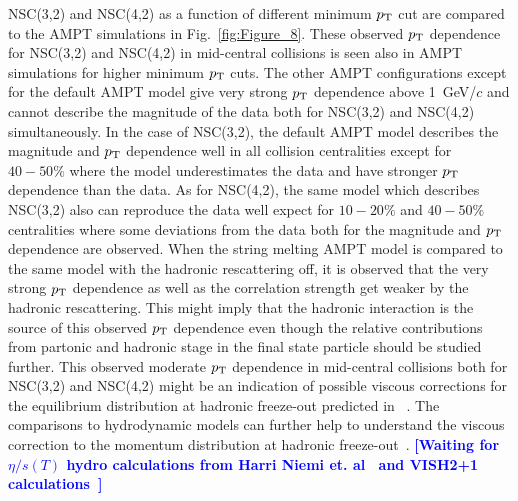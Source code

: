 NSC(3,2) and NSC(4,2) as a function of different minimum $p_{\rm T}$ cut are compared to the {AMPT} simulations in Fig.~\ref{fig:Figure_8}.
These observed $p_{\rm T}$ dependence for NSC(3,2) and NSC(4,2) in mid-central collisions is seen also in AMPT simulations for higher minimum $p_{\rm T}$ cuts.
The other AMPT configurations except for the default AMPT model give very strong $p_{\rm T}$ dependence above 1~GeV/$c$ and cannot describe the magnitude of the data both for NSC(3,2) and NSC(4,2) simultaneously.
In the case of NSC(3,2), the default AMPT model describes the magnitude and $p_{\rm T}$ dependence well in all collision centralities except for $40-50\%$ where the model underestimates the data and have stronger $p_{\rm T}$ dependence than the data.
As for  NSC(4,2), the same model which describes NSC(3,2) also can reproduce the data well expect for $10-20\%$ and $40-50\%$ centralities where some deviations from the data both for the magnitude and $p_{\rm T}$ dependence are observed.
When the string melting AMPT model is compared to the same model with the hadronic rescattering off, it is observed that the very strong $p_{\rm T}$ dependence as well as the correlation strength get weaker by the hadronic rescattering.
This might imply that the hadronic interaction is the source of this observed $p_{\rm T}$ dependence even though the relative contributions from partonic and hadronic stage in the final state particle should be studied further.
This observed moderate $p_{\rm T}$ dependence in mid-central collisions both for NSC(3,2) and NSC(4,2) might be an indication of possible viscous corrections for the equilibrium distribution at hadronic freeze-out predicted in ~\cite{Luzum:2010ad}.
The comparisons to hydrodynamic models can further help to understand the viscous correction to the momentum distribution at hadronic freeze-out~\cite{Teaney:2012ke,Niemi:2015qia}.
\noindent\textbf{\textcolor{blue}{[Waiting for $\eta/s(T)$ hydro calculations from Harri Niemi et. al~\cite{} and VISH2+1 calculations~\cite{Zhu:2016puf}]}}



\pagebreak
 

